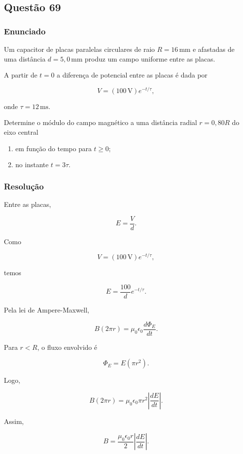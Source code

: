 \subsection{Questão 69}

\subsubsection{Enunciado}

Um capacitor de placas paralelas circulares de raio 
\(R = 16\,\text{mm}\) e afastadas de uma distância 
\(d = 5{,}0\,\text{mm}\) produz um campo uniforme entre as placas.

A partir de \(t = 0\) a diferença de potencial entre as placas é dada por

\[
V = (100\,\text{V})e^{-t/\tau},
\]

onde \(\tau = 12\,\text{ms}\).

Determine o módulo do campo magnético a uma distância radial 
\(r = 0{,}80R\) do eixo central

\begin{enumerate}
    \item[(a)] em função do tempo para \(t \geq 0\);

    \item[(b)] no instante \(t = 3\tau\).
\end{enumerate}


\subsubsection{Resolução}

Entre as placas,

\[
E=\frac{V}{d}.
\]

Como

\[
V=(100\,\text{V})e^{-t/\tau},
\]

temos

\[
E=\frac{100}{d}e^{-t/\tau}.
\]

Pela lei de Ampere-Maxwell,

\[
B(2\pi r)=\mu_0\epsilon_0\frac{d\Phi_E}{dt}.
\]

Para \(r<R\), o fluxo envolvido é

\[
\Phi_E=E(\pi r^2).
\]

Logo,

\[
B(2\pi r)=\mu_0\epsilon_0\pi r^2
\left|\frac{dE}{dt}\right|.
\]

Assim,

\[
B=\frac{\mu_0\epsilon_0 r}{2}
\left|\frac{dE}{dt}\right|.
\]

